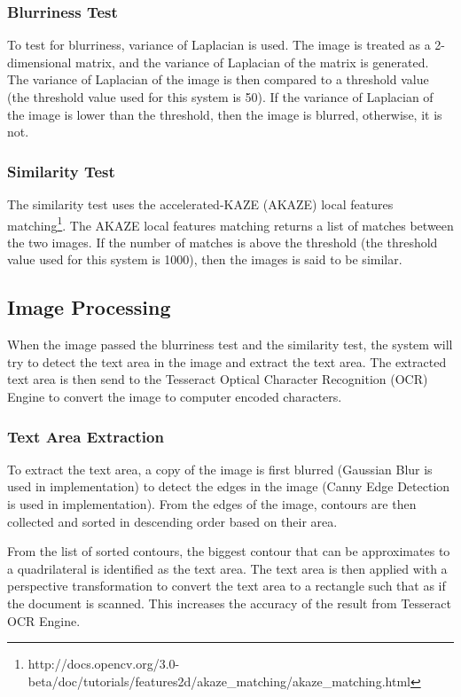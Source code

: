 \subsubsection{Blurriness Test}
To test for blurriness, variance of Laplacian is used. The image is treated as a 2-dimensional matrix, and the variance of Laplacian of the matrix is generated. The variance of Laplacian of the image is then compared to a threshold value (the threshold value used for this system is 50). If the variance of Laplacian of the image is lower than the threshold, then the image is blurred, otherwise, it is not.

\subsubsection{Similarity Test}
The similarity test uses the accelerated-KAZE (AKAZE) local features matching\footnote{http://docs.opencv.org/3.0-beta/doc/tutorials/features2d/akaze\_matching/akaze\_matching.html}. The AKAZE local features matching returns a list of matches between the two images. If the number of matches is above the threshold (the threshold value used for this system is 1000), then the images is said to be similar.

\subsection{Image Processing}
When the image passed the blurriness test and the similarity test, the system will try to detect the text area in the image and extract the text area. The extracted text area is then send to the Tesseract Optical Character Recognition (OCR) Engine to convert the image to computer encoded characters.

\subsubsection{Text Area Extraction}
To extract the text area, a copy of the image is first blurred (Gaussian Blur is used in implementation) to detect the edges in the image (Canny Edge Detection is used in implementation). From the edges of the image, contours are then collected and sorted in descending order based on their area.


From the list of sorted contours, the biggest contour that can be approximates to a quadrilateral is identified as the text area. The text area is then applied with a perspective transformation to convert the text area to a rectangle such that as if the document is scanned. This increases the accuracy of the result from Tesseract OCR Engine. 

